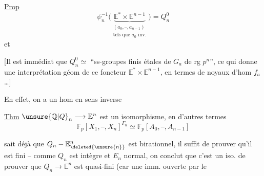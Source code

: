 \uline{Prop} \[
\psi_n^{-1}\bigl(\underbrace{\mathbb E^*\times\mathbb E^{n-1}}_{\substack{(a_0,\text{--},a_{n-1})\\\text{tels que }a_0\text{ inv.}}}\bigr)=Q_n^0
\]
et

 [Il est immédiat que $Q_n^0\simeq$ ``ss-groupes finis étales de $G_a$ de rg $p^n$'', ce qui donne une interprétation géom de ce foncteur  $\mathbb E^*\times\mathbb E^{n-1}$, en termes de noyaux d'hom $f_a$ \ldots]

En effet, on a un  hom en sens inverse

\uline{Thm} $\unsure{\mathbb Q|Q}_n\longrightarrow\mathbb E^n$ est un isomorphisme, en d'autres termes
\[ \mathbb F_p[X_1,\text{--},X_n]^{\Gamma_n}\simeq\mathbb F_p[A_0,\text{--},A_{n-1}] \]

 sait déjà que $Q_n\mathbin{-}\mathbb E_{\deleted{\unsure{n}}}^{n}$ est birationnel, il suffit de prouver qu'il est fini  -- comme $Q_n$ est intègre et $E_n$ normal, on conclut que c'est un iso.
   de prouver que $Q_n\to\mathbb E^n$  est quasi-fini (car  une imm. ouverte par le
